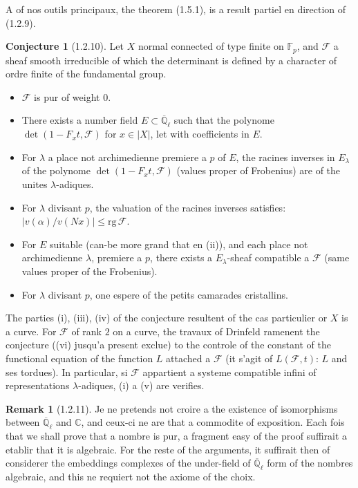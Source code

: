 \documentclass[12pt,a4paper]{article}
\theoremstyle{plain}
\theoremstyle{definition}
\newtheorem{remark}[theorem]{Remark}
\newtheorem{conjecture}[theorem]{Conjecture}
\theoremstyle{definition}
\theoremstyle{remark}
\begin{document}
A of nos outils principaux, the theorem (1.5.1), is a result partiel en direction of (1.2.9).

\begin{conjecture}[1.2.10]
Let $X$ normal connected of type finite on $\mathbb{F}_p$, and $\mathscr{F}$ a sheaf smooth irreducible of which the determinant is defined by a character of ordre finite of the fundamental group.
\begin{itemize}[nosep]
\item[(i)] $\mathscr{F}$ is pur of weight $0$.
\item[(ii)] There exists a number field $E \subset \overline{\mathbb{Q}}_\ell$ such that the polynome $\det(1 - F_x t, \mathscr{F})$ for $x \in |X|$, let with coefficients in $E$.
\item[(iii)] For $\lambda$ a place not archimedienne premiere a $p$ of $E$, the racines inverses in $E_\lambda$ of the polynome $\det(1 - F_x t, \mathscr{F})$ (values proper of Frobenius) are of the unites $\lambda$-adiques.
\item[(iv)] For $\lambda$ divisant $p$, the valuation of the racines inverses satisfies: $|v(\alpha) / v(Nx)| \leq \text{rg}\,\mathscr{F}$.
\item[(v)] For $E$ suitable (can-be more grand that en (ii)), and each place not archimedienne $\lambda$, premiere a $p$, there exists a $E_\lambda$-sheaf compatible a $\mathscr{F}$ (same values proper of the Frobenius).
\item[(vi)] For $\lambda$ divisant $p$, one espere of the petits camarades cristallins.
\end{itemize}
\end{conjecture}

The parties (i), (iii), (iv) of the conjecture resultent of the cas particulier or $X$ is a curve. For $\mathscr{F}$ of rank $2$ on a curve, the travaux of Drinfeld ramenent the conjecture ((vi) jusqu'a present exclue) to the controle of the constant of the functional equation of the function $L$ attached a $\mathscr{F}$ (it s'agit of $L(\mathscr{F}, t)$: $L$ and ses tordues). In particular, si $\mathscr{F}$ appartient a systeme compatible infini of representations $\lambda$-adiques, (i) a (v) are verifies.

\begin{remark}[1.2.11]
Je ne pretends not croire a the existence of isomorphisms between $\overline{\mathbb{Q}}_\ell$ and $\mathbb{C}$, and ceux-ci ne are that a commodite of exposition. Each fois that we shall prove that a nombre is pur, a fragment easy of the proof suffirait a etablir that it is algebraic. For the reste of the arguments, it suffirait then of considerer the embeddings complexes of the under-field of $\overline{\mathbb{Q}}_\ell$ form of the nombres algebraic, and this ne requiert not the axiome of the choix.
\end{remark}
\end{document}
